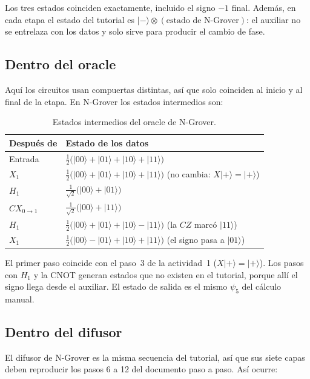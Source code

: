 \documentclass[11pt,a4paper]{article}
\providecommand{\ket}{}\renewcommand{\ket}[1]{\lvert #1\rangle}
\begin{document}
Los tres estados coinciden exactamente, incluido el signo $-1$ final. Además, en cada etapa el estado del
tutorial es $\ket-\otimes(\text{estado de N-Grover})$: el auxiliar no se entrelaza con los datos y solo sirve
para producir el cambio de fase.

\subsection{Dentro del oracle}

Aquí los circuitos usan compuertas distintas, así que solo coinciden al inicio y al final de la etapa. En
N-Grover los estados intermedios son:

\begin{table}[H]
\centering
\small
\begin{tabular}{@{}ll@{}}
\toprule
Después de & Estado de los datos\\
\midrule
Entrada & $\tfrac12\big(\ket{00}+\ket{01}+\ket{10}+\ket{11}\big)$\\
$X_1$ & $\tfrac12\big(\ket{00}+\ket{01}+\ket{10}+\ket{11}\big)$ \quad (no cambia: $X\ket+=\ket+$)\\
$H_1$ & $\tfrac{1}{\sqrt2}\big(\ket{00}+\ket{01}\big)$\\
$CX_{0\to1}$ & $\tfrac{1}{\sqrt2}\big(\ket{00}+\ket{11}\big)$\\
$H_1$ & $\tfrac12\big(\ket{00}+\ket{01}+\ket{10}-\ket{11}\big)$ \quad (la $CZ$ marcó $\ket{11}$)\\
$X_1$ & $\tfrac12\big(\ket{00}-\ket{01}+\ket{10}+\ket{11}\big)$ \quad (el signo pasa a $\ket{01}$)\\
\bottomrule
\end{tabular}
\caption{Estados intermedios del oracle de N-Grover.}
\end{table}

El primer paso coincide con el paso~3 de la actividad~1 ($X\ket+=\ket+$). Los pasos con $H_1$ y la CNOT generan
estados que no existen en el tutorial, porque allí el signo llega desde el auxiliar. El estado de salida es el
mismo $\psi_5$ del cálculo manual.

\subsection{Dentro del difusor}

El difusor de N-Grover es la misma secuencia del tutorial, así que sus siete capas deben reproducir los pasos
6 a 12 del documento paso a paso. Así ocurre:
\end{document}
